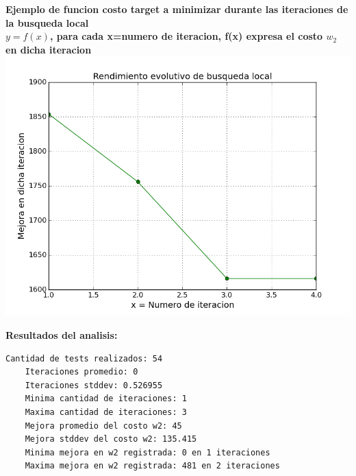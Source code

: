 \begin{center}
	\textbf{Ejemplo de funcion costo target a minimizar durante las iteraciones de la busqueda local}\\
	\textbf{$y = f(x)$, para cada x=numero de iteracion, f(x) expresa el costo $w_2$ en dicha iteracion}\\
	\includegraphics[scale=0.7]{experimentos/bqlocal/rendimiento_evolutivo_absoluto_lineal/bqlocal/instancia_500_4999_in_iters_w2_absolute_value.png}
\end{center}

\vspace{1cm}

\textbf{Resultados del analisis:}
\begin{lstlisting}[frame=single]
	Cantidad de tests realizados: 54
	Iteraciones promedio: 0
	Iteraciones stddev: 0.526955
	Minima cantidad de iteraciones: 1
	Maxima cantidad de iteraciones: 3
	Mejora promedio del costo w2: 45
	Mejora stddev del costo w2: 135.415
	Minima mejora en w2 registrada: 0 en 1 iteraciones
	Maxima mejora en w2 registrada: 481 en 2 iteraciones
\end{lstlisting}

